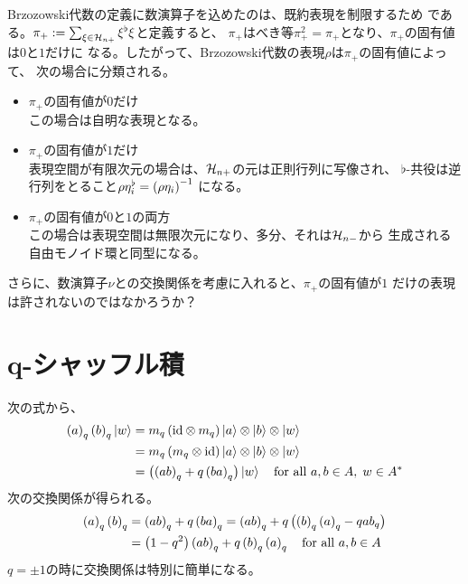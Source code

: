 {	\begin{todo}[Brzozowski代数の既約表現]
	\label{todo:Brzozowski代数の既約表現} %
		Brzozowski代数の定義に数演算子を込めたのは、既約表現を制限するため
		である。$\pi_+:=\sum_{\xi\in{\ensuremath{{\mathcal{H}}}}_{n+}}\xi^\flat\xi$と定義すると、
		$\pi_+$はべき等$\pi_+^2=\pi_+$となり、$\pi_+$の固有値は$0$と$1$だけに
		なる。したがって、Brzozowski代数の表現$\rho$は$\pi_+$の固有値によって、
		次の場合に分類される。
		\begin{itemize}\setlength{\itemsep}{-1mm} %
			\item $\pi_+$の固有値が$0$だけ \\
			この場合は自明な表現となる。
			\item $\pi_+$の固有値が$1$だけ \\
			表現空間が有限次元の場合は、${{\mathcal{H}}}_{n+}$の元は正則行列に写像され、
			$\flat$-共役は逆行列をとること$\rho\eta_i^\flat=\mathinner{\left({\rho\eta_i}\right)}^{-1}$
			になる。
			\item $\pi_+$の固有値が$0$と$1$の両方 \\
			この場合は表現空間は無限次元になり、多分、それは${{\mathcal{H}}}_{n-}$から
			生成される自由モノイド環と同型になる。
		\end{itemize} %
		さらに、数演算子$\nu$との交換関係を考慮に入れると、$\pi_+$の固有値が$1$
		だけの表現は許されないのではなかろうか？
	\end{todo} %
\section{q-シャッフル積}\label{s1:q-シャッフル積} %
	次の式から、
	\begin{equation*}\begin{split}
		\mathinner{\left({a}\right)}_q\mathinner{\left({b}\right)}_q\mathinner{|{w}\rangle} 
		&= m_q\mathinner{\left({{\ensuremath{\operatorname{id}}}\otimes m_q}\right)}\mathinner{|{a}\rangle}\otimes\mathinner{|{b}\rangle}\otimes\mathinner{|{w}\rangle} \\
		&= m_q\mathinner{\left({m_q\otimes{\ensuremath{\operatorname{id}}}}\right)}\mathinner{|{a}\rangle}\otimes\mathinner{|{b}\rangle}\otimes\mathinner{|{w}\rangle} \\
		&= \mathinner{\bigl({\mathinner{\left({ab}\right)}_q + q\mathinner{\left({ba}\right)}_q}\bigr)}\mathinner{|{w}\rangle}
		\quad\text{for all } a,b\in A,\; w\in A^*
	\end{split}\end{equation*}
	次の交換関係が得られる。
	\begin{equation*}\begin{split}
		\mathinner{\left({a}\right)}_q\mathinner{\left({b}\right)}_q &= \mathinner{\left({ab}\right)}_q + q\mathinner{\left({ba}\right)}_q
		= \mathinner{\left({ab}\right)}_q + q\mathinner{\bigl({\mathinner{\left({b}\right)}_q\mathinner{\left({a}\right)}_q - q{ab}_q}\bigr)} \\
		&= \mathinner{\left({1 - q^2}\right)}\mathinner{\left({ab}\right)}_q + q\mathinner{\left({b}\right)}_q\mathinner{\left({a}\right)}_q
		\quad\text{for all } a,b\in A
	\end{split}\end{equation*}
	$q=\pm1$の時に交換関係は特別に簡単になる。
%
}\endgroup %
